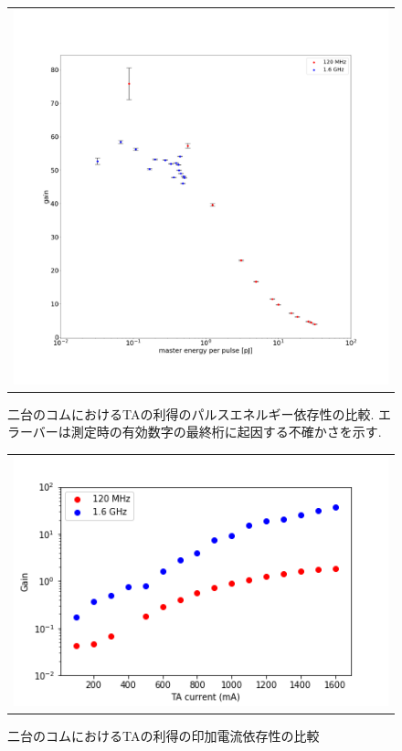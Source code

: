 \documentclass[uplatex, dvipdfmx, a4paper, report, papersize, 11pt]{jsbook}
\begin{document}
\begin{figure}[htpb]
\begin{tabular}{c}
      \begin{minipage}{1\hsize}
        \centering
          \includegraphics[keepaspectratio,  scale=0.25,  angle=0]
                          {figures/chapter4/pulse_power-gain-comparison_errorbar.png}
                          \caption{二台のコムにおけるTAの利得のパルスエネルギー依存性の比較. エラーバーは測定時の有効数字の最終桁に起因する不確かさを示す. }
                          \label{pulse_power-gain-comparison}
      \end{minipage}
    \end{tabular}
\end{figure}

\newpage
\begin{figure}[H]
  \centering
    \begin{tabular}{c}
      \begin{minipage}{1\hsize}
        \centering
          \includegraphics[keepaspectratio,  scale=0.8,  angle=0]
          {figures/chapter4/TA_cuurent-gain_comparison.png}
          \caption{二台のコムにおけるTAの利得の印加電流依存性の比較}
          \label{TA_cuurent-gain_comparison}
      \end{minipage}
    \end{tabular}
\end{figure}
\newpage
\end{document}
